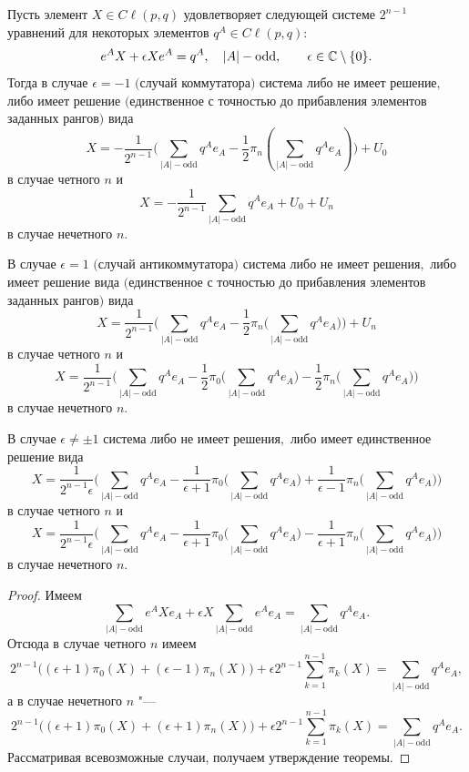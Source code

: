 \smallskip
\begin{theorem}[7]Пусть элемент $X\in {{C}\!\ell}(p,q)$ удовлетворяет следующей системе $2^{n-1}$ уравнений для некоторых элементов $q^A\in{{C}\!\ell}(p,q){:}$
\begin{equation}
e^A X+\epsilon X e^A=q^A,\quad |A|- \text{odd},\qquad \epsilon\in{\Bbb C}\setminus\{0\}.
\end{equation}
Тогда в случае $\epsilon=-1$ $($случай коммутатора$)$ система либо не имеет ре\-ше\-ние$,$ либо имеет решение $($единственное с точностью до прибавления элементов заданных ран\-гов$)$ вида
$$X=-\frac{1}{2^{n-1}}\biggl(\sum_{|A|-\text{odd}}q^A e_A-\frac{1}{2}\pi_n(\sum_{|A|-\text{odd}}q^A e_A)\biggr)+U_0$$ в случае четного $n$ и
$$X=-\frac{1}{2^{n-1}}\sum_{|A|-\text{odd}}q^A e_A+U_0+U_n$$ в случае нечетного $n.$

В случае $\epsilon=1$ $($случай антикоммутатора$)$ система либо не имеет ре\-ше\-ния$,$ либо имеет решение вида $($единственное с точностью до прибавления элементов заданных рангов$)$ вида
$$X=\frac{1}{2^{n-1}}\biggl(\sum_{|A|-\text{odd}}q^A e_A-\frac{1}{2}\pi_n\biggl(\sum_{|A|-\text{odd}}q^A e_A\biggr)\biggr)+U_n$$
в случае четного $n$ и
$$X=\frac{1}{2^{n-1}}\biggl(\sum_{|A|-\text{odd}}q^A e_A-\frac{1}{2}\pi_0\biggl(\sum_{|A|-\text{odd}}q^A e_A\biggr)-\frac{1}{2}\pi_n\biggl(\sum_{|A|-\text{odd}}q^A e_A\biggr)\biggr)$$
в случае нечетного $n.$

В случае $\epsilon\neq\pm 1$ система либо не имеет ре\-ше\-ния$,$ либо имеет единственное решение вида
$$X=\frac{1}{2^{n-1}\epsilon}\biggl(\sum_{|A|-\text{odd}}q^A e_A-\frac{1}{\epsilon+1}\pi_0\biggl(\sum_{|A|-\text{odd}}q^A e_A\biggr)+\frac{1}{\epsilon-1}\pi_n\biggl(\sum_{|A|-\text{odd}}q^A e_A\biggr)\biggr)$$
в случае четного $n$ и
$$X=\frac{1}{2^{n-1}\epsilon}\biggl(\sum_{|A|-\text{odd}}q^A e_A-\frac{1}{\epsilon+1}\pi_0
\biggl(\sum_{|A|-\text{odd}}q^A e_A\biggr)-\frac{1}{\epsilon+1}\pi_n
\biggl(\sum_{|A|-\text{odd}}q^A e_A\biggr)\biggr)$$
в случае нечетного $n$.
\end{theorem}

\smallskip

\begin{proof} Имеем
$$\sum_{|A|-\text{odd}}e^A X e_A+\epsilon X \sum_{|A|-\text{odd}}e^A e_A=\sum_{|A|-\text{odd}}q^A e_A.$$
Отсюда в случае четного $n$ имеем
$$2^{n-1}\bigl((\epsilon+1)\pi_0(X)+(\epsilon-1)\pi_n(X)\bigr)+\epsilon 2^{n-1}\sum_{k=1}^{n-1} \pi_k(X) =\sum_{|A|-\text{odd}}q^A e_A,$$
а в случае нечетного $n$ "---
$$2^{n-1}\bigl((\epsilon+1)\pi_0(X)+(\epsilon+1)\pi_n(X)\bigr)+\epsilon 2^{n-1} \sum_{k=1}^{n-1} \pi_k(X)=\sum_{|A|-\text{odd}}q^A e_A.$$
Рассматривая всевозможные случаи, получаем утверждение теоремы.
\end{proof}

